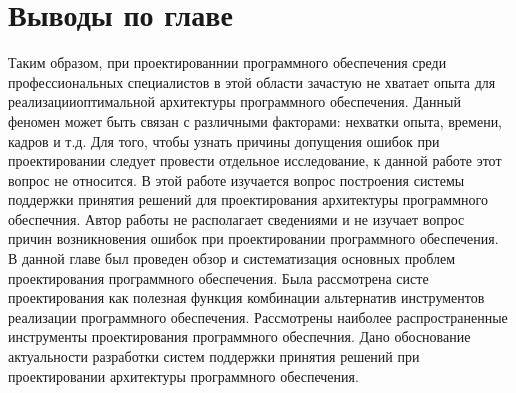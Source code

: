 \section{Выводы по главе}\label{sec:ch1/conc}
Таким образом, при проектированнии программного обеспечения среди профессиональных специалистов в этой области зачастую не хватает опыта для реализацииоптимальной архитектуры программного обеспечения. Данный феномен может быть связан с различными факторами:  нехватки опыта, времени, кадров и т.д. Для того, чтобы узнать причины допущения ошибок при проектировании следует провести отдельное исследование, к данной работе этот вопрос не относится. В этой работе изучается вопрос построения системы поддержки принятия решений для проектирования архитектуры программного обеспечния. Автор работы не располагает сведениями и не изучает вопрос причин возникновения ошибок при проектировании программного обеспечения.
В данной главе был проведен обзор и систематизация основных проблем проектирования программного обеспечения. Была рассмотрена систе проектирования как полезная функция комбинации альтернатив инструментов реализации программного обеспечения. Рассмотрены наиболее распространенные инструменты проектирования программного обеспечния. Дано обоснование актуальности разработки систем поддержки принятия решений при проектировании архитектуры программного обеспечения.
\clearpage

